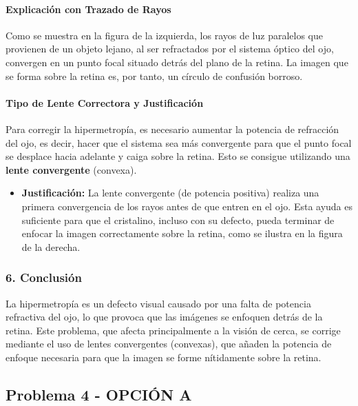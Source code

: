\paragraph{Explicación con Trazado de Rayos}
Como se muestra en la figura de la izquierda, los rayos de luz paralelos que provienen de un objeto lejano, al ser refractados por el sistema óptico del ojo, convergen en un punto focal situado detrás del plano de la retina. La imagen que se forma sobre la retina es, por tanto, un círculo de confusión borroso.

\paragraph{Tipo de Lente Correctora y Justificación}
Para corregir la hipermetropía, es necesario aumentar la potencia de refracción del ojo, es decir, hacer que el sistema sea más convergente para que el punto focal se desplace hacia adelante y caiga sobre la retina.
Esto se consigue utilizando una \textbf{lente convergente} (convexa).
\begin{itemize}
    \item \textbf{Justificación:} La lente convergente (de potencia positiva) realiza una primera convergencia de los rayos antes de que entren en el ojo. Esta ayuda es suficiente para que el cristalino, incluso con su defecto, pueda terminar de enfocar la imagen correctamente sobre la retina, como se ilustra en la figura de la derecha.
\end{itemize}

\subsubsection*{6. Conclusión}
\begin{cajaconclusion}
La hipermetropía es un defecto visual causado por una falta de potencia refractiva del ojo, lo que provoca que las imágenes se enfoquen detrás de la retina. Este problema, que afecta principalmente a la visión de cerca, se corrige mediante el uso de lentes convergentes (convexas), que añaden la potencia de enfoque necesaria para que la imagen se forme nítidamente sobre la retina.
\end{cajaconclusion}

\newpage

\subsection{Problema 4 - OPCIÓN A}
\label{subsec:4A_2015_jun_ord}

